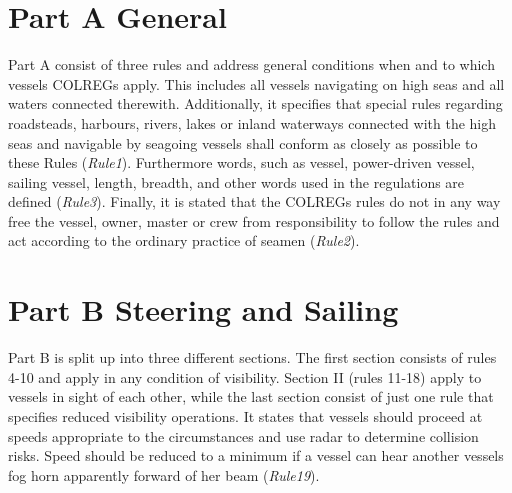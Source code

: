 \section{Part A General}

Part A consist of three rules and address general conditions when and to which vessels COLREGs apply. This includes all vessels navigating on high seas and all waters connected therewith. Additionally, it specifies that special rules regarding roadsteads, harbours, rivers, lakes or inland waterways connected with the high seas and navigable by seagoing vessels shall conform as closely as possible to these Rules (\textit{Rule1}). Furthermore words, such as vessel, power-driven vessel, sailing vessel, length, breadth, and other words used in the regulations are defined (\textit{Rule3}). Finally, it is stated that the COLREGs rules do not in any way free the vessel, owner, master or crew from responsibility to follow the rules and act according to the ordinary practice of seamen (\textit{Rule2}).

\section{Part B Steering and Sailing}
Part B is split up into three different sections. The first section consists of rules  4-10 and apply in any condition of visibility. Section II (rules 11-18) apply to vessels in sight of each other, while the last section consist of just one rule that specifies reduced visibility operations. It states that vessels should proceed at speeds appropriate to the circumstances and use radar to determine collision risks. Speed should be reduced to a minimum if a vessel can hear another vessels fog horn apparently forward of her beam (\textit{Rule19}).

